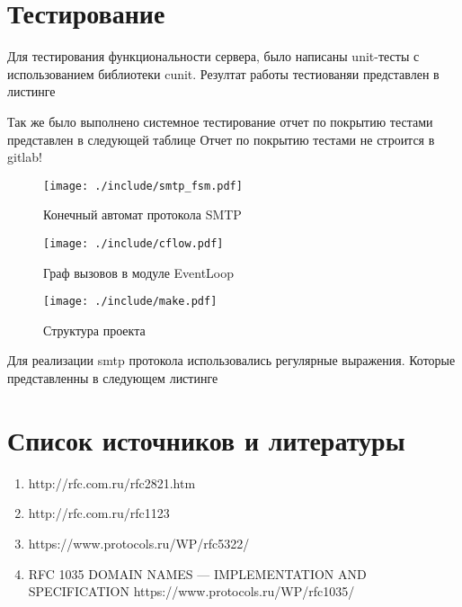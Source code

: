 \documentclass[a4paper,12pt]{report}
\begin{document}
	\section{Тестирование}
		Для тестирования функциональности сервера, было написаны unit-тесты
		с использованием библиотеки cunit. Резултат работы тестиованяи представлен
		в листинге 
		
		Так же было выполнено системное тестирование
		отчет по покрытию тестами представлен в следующей таблице
		Отчет по покрытию тестами не строится в  gitlab!

	\begin{figure}
	\centering
	\texttt{[image: ./include/smtp\_fsm.pdf]}
	\caption{Конечный автомат протокола SMTP}
	\label{fig:smtp_fsm}
	\end{figure}

	\begin{figure}
	\centering
	\texttt{[image: ./include/cflow.pdf]}
	\caption{Граф вызовов в модуле EventLoop}
	\label{fig:event}
	\end{figure}

	\begin{figure}
	\centering
	\texttt{[image: ./include/make.pdf]}
	\caption{Структура проекта}
	\label{fig:make_server}
	\end{figure}

	Для реализации smtp протокола использовались регулярные выражения. Которые представленны в следующем листинге
	

	\section{Список источников и литературы}
	\begin{enumerate}
		\item http://rfc.com.ru/rfc2821.htm
		\item http://rfc.com.ru/rfc1123
		\item https://www.protocols.ru/WP/rfc5322/
		\item RFC 1035 DOMAIN NAMES — IMPLEMENTATION AND SPECIFICATION  https://www.protocols.ru/WP/rfc1035/
	\end{enumerate}
\end{document}
